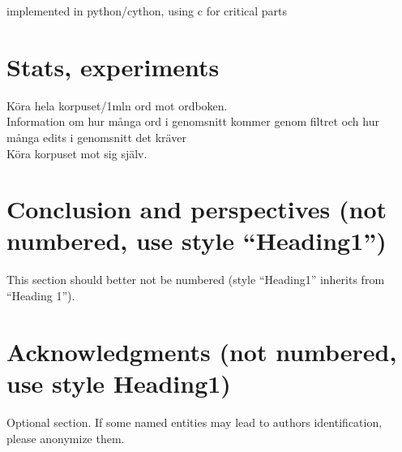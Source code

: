 \documentclass[10pt,a5paper,twoside]{article}
\begin{document}

implemented in python/cython, using c for critical parts

\section{Stats, experiments}
Köra hela korpuset/1mln ord mot ordboken. \\
Information om hur många ord i genomsnitt kommer genom filtret
och hur många edits i genomsnitt det kräver \\
Köra korpuset mot sig själv.

\section*{Conclusion and perspectives (not numbered, use style “Heading1”)} %
This section should better not be numbered (style “Heading1” inherits from “Heading 1”).

\section*{Acknowledgments (not numbered, use style Heading1)}
Optional section. If some named entities may lead to authors identification, please anonymize them.	\\

%





\nocite{TALN2007,LaigneletRioult09,LanglaisPatry07,au1972,cks1981,mb2012}

\end{document}
